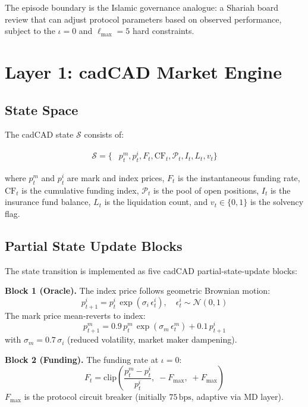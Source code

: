\documentclass[10pt,twocolumn]{article}
\theoremstyle{plain}
\theoremstyle{definition}
\begin{document}
The episode boundary is the Islamic governance analogue:
a Shariah board review that can adjust protocol parameters
based on observed performance, subject to the $\iota=0$
and $\ell_{\max}=5$ hard constraints.

\section{Layer 1: cadCAD Market Engine}
\label{sec:cadcad}

\subsection{State Space}

The cadCAD state $\mathcal{S}$ consists of:

\begin{align}
\mathcal{S} = \{&p^m_t, p^i_t, F_t, \mathrm{CF}_t,
  \mathcal{P}_t, I_t, L_t, v_t \}
\end{align}

where $p^m_t$ and $p^i_t$ are mark and index prices,
$F_t$ is the instantaneous funding rate,
$\mathrm{CF}_t$ is the cumulative funding index,
$\mathcal{P}_t$ is the pool of open positions,
$I_t$ is the insurance fund balance,
$L_t$ is the liquidation count, and
$v_t \in \{0,1\}$ is the solvency flag.

\subsection{Partial State Update Blocks}

The state transition is implemented as five cadCAD
partial-state-update blocks:

\textbf{Block 1 (Oracle).}  The index price follows
geometric Brownian motion:
\begin{equation}
  p^i_{t+1} = p^i_t\,\exp\!\left(\sigma_i\,\epsilon_t^i\right),
  \quad \epsilon_t^i \sim \mathcal{N}(0,1)
  \label{eq:index_gbm}
\end{equation}
The mark price mean-reverts to index:
\begin{equation}
  p^m_{t+1} = 0.9\,p^m_t\,\exp\!\left(\sigma_m\,\epsilon_t^m\right)
             + 0.1\,p^i_{t+1}
  \label{eq:mark_mr}
\end{equation}
with $\sigma_m = 0.7\,\sigma_i$ (reduced volatility,
market maker dampening).

\textbf{Block 2 (Funding).}  The funding rate at $\iota=0$:
\begin{equation}
  F_t = \mathrm{clip}\!\left(
    \frac{p^m_t - p^i_t}{p^i_t},\; -F_{\max},\; +F_{\max}
  \right)
  \label{eq:funding_cadcad}
\end{equation}
$F_{\max}$ is the protocol circuit breaker (initially
$75\,\mathrm{bps}$, adaptive via MD layer).
\end{document}
